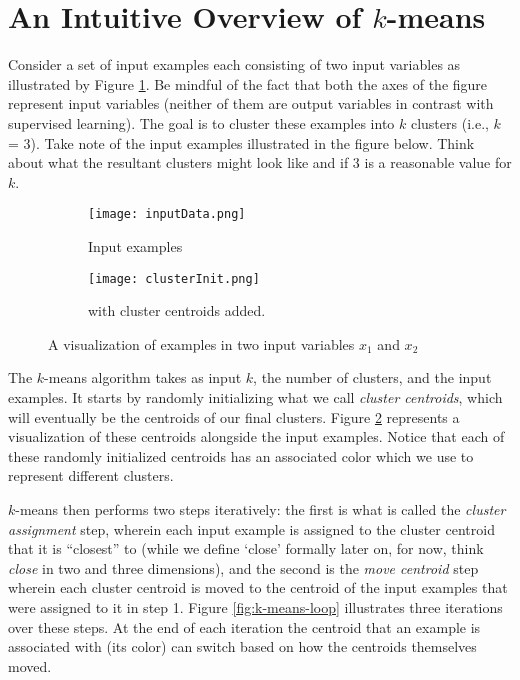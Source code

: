 \section{An Intuitive Overview of $k$-means}

Consider a set of input examples each consisting of two input variables as illustrated by Figure \ref{fig:input-data-a}. Be mindful of the fact that both the axes of the figure represent input variables (neither of them are output variables in contrast with supervised learning). The goal is to cluster these examples into $k$ clusters (i.e., $k$ = 3). Take note of the input examples illustrated in the figure below. Think about what the resultant clusters might look like and if 3 is a reasonable value for $k$. 
\begin{figure}
     \centering
     \begin{subfigure}[b]{0.48\textwidth}
         \centering
         \texttt{[image: inputData.png]}
         \caption{Input examples}
         \label{fig:input-data-a}
     \end{subfigure}
     \hfill
     \begin{subfigure}[b]{0.48\textwidth}
         \centering
         \texttt{[image: clusterInit.png]}
         \caption{with cluster centroids added.}
         \label{fig:input-data-b}
     \end{subfigure}
     \hfill
        \caption{A visualization of examples in two input variables $x_1$ and $x_2$}
        \label{fig:input-data}
\end{figure}

The $k$-means algorithm takes as input $k$, the number of clusters, and the input examples. It starts by randomly initializing what we call \emph{cluster centroids}, which will eventually be the centroids of our final clusters. Figure \ref{fig:input-data-b} represents a visualization of these centroids alongside the input examples. Notice that each of these randomly initialized centroids has an associated color which we use to represent different clusters. 

$k$-means then performs two steps iteratively: the first is what is called the \emph{cluster assignment} step, wherein each input example is assigned to the cluster centroid that it is ``closest'' to (while we define `close' formally later on, for now, think \emph{close} in two and three dimensions), and the second is the \emph{move centroid} step wherein each cluster centroid is moved to the centroid of the input examples that were assigned to it in step 1. Figure \ref{fig:k-means-loop} illustrates three iterations over these steps. At the end of each iteration the centroid that an example is associated with (its color) can switch based on how the centroids themselves moved. 

